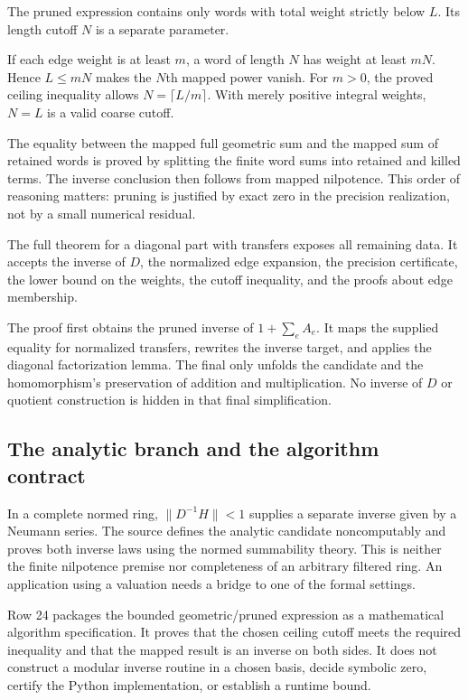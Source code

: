 The pruned expression contains only words with total weight strictly below $L$. Its length cutoff $N$ is a separate parameter.

If each edge weight is at least $m$, a word of length $N$ has weight at least $mN$. Hence $L\le mN$ makes the $N$th mapped power vanish. For $m>0$, the proved ceiling inequality allows $N=\lceil L/m\rceil$. With merely positive integral weights, $N=L$ is a valid coarse cutoff.

The equality between the mapped full geometric sum and the mapped sum of retained words is proved by splitting the finite word sums into retained and killed terms. The inverse conclusion then follows from mapped nilpotence. This order of reasoning matters: pruning is justified by exact zero in the precision realization, not by a small numerical residual.

The full theorem for a diagonal part with transfers exposes all remaining data. It accepts the inverse of $D$, the normalized edge expansion, the precision certificate, the lower bound on the weights, the cutoff inequality, and the proofs about edge membership.

The proof first obtains the pruned inverse of $1+\sum_eA_e$. It maps the supplied equality for normalized transfers, rewrites the inverse target, and applies the diagonal factorization lemma. The final  only unfolds the candidate and the homomorphism's preservation of addition and multiplication. No inverse of $D$ or quotient construction is hidden in that final simplification.

\subsection{The analytic branch and the algorithm contract}

In a complete normed ring, $\|D^{-1}H\|<1$ supplies a separate inverse given by a Neumann series. The source defines the analytic candidate noncomputably and proves both inverse laws using the normed summability theory. This is neither the finite nilpotence premise nor completeness of an arbitrary filtered ring. An application using a valuation needs a bridge to one of the formal settings.

Row 24 packages the bounded geometric/pruned expression as a mathematical algorithm specification. It proves that the chosen ceiling cutoff meets the required inequality and that the mapped result is an inverse on both sides. It does not construct a modular inverse routine in a chosen basis, decide symbolic zero, certify the Python implementation, or establish a runtime bound.

